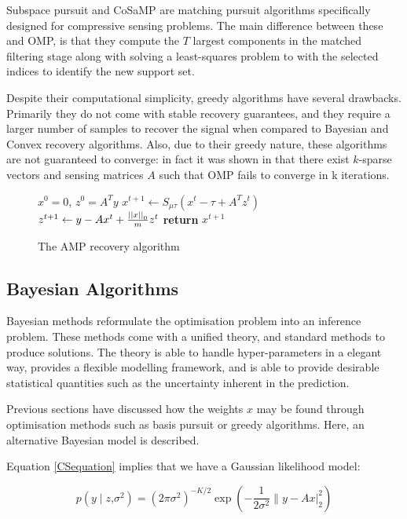 Subspace pursuit and CoSaMP are matching pursuit algorithms specifically designed for compressive sensing problems. The main difference between these and OMP, is that they compute the \(T\) largest components in the matched filtering stage along with solving a least-squares problem to with the selected indices to identify the new support set.

Despite their computational simplicity, greedy algorithms have several drawbacks. Primarily they do not come with stable recovery guarantees, and they require a larger number of samples to recover the signal when compared to Bayesian and Convex recovery algorithms. Also, due to their greedy nature, these algorithms are not guaranteed to converge: in fact it was shown in \cite{wen2013improved} that there exist \(k\)-sparse vectors and sensing matrices \(A\) such that OMP fails to converge in k iterations.

\begin{figure}
\begin{algorithmic}[1]
\State $x^0 = 0$, $z^0=A^Ty$
\State $x^{t+1} \gets S_{\mu\tau}\left(x^t - \tau+ A^Tz^t\right) $
\State $z^{t+1} \gets y - Ax^t + \frac{\left|\left|x\right|\right|_0}{m}z^t$
\EndWhile
\State \textbf{return} $x^{t+1}$
\EndProcedure
\end{algorithmic}
\caption{The AMP recovery algorithm}\label{alg:amp}
\end{figure}

\subsection{Bayesian Algorithms}
Bayesian methods reformulate the optimisation problem into an inference problem. These methods come with a unified theory, and standard methods to produce solutions. The theory is able to handle hyper-parameters in a elegant way, provides a flexible modelling framework, and is able to provide desirable statistical quantities such as the uncertainty inherent in the prediction.

Previous sections have discussed how the weights \(x\) may be found through optimisation methods such as basis pursuit or greedy algorithms. Here, an alternative Bayesian model is described.

Equation \eqref{CSequation} implies that we have a Gaussian likelihood model: 

\begin{equation}
p \left(y \mid z\text{,} \sigma^2 \right) = (2 \pi \sigma^2)^{-K/2} \exp{\left(- \frac{1}{2 \sigma^2} \|y - Ax|_{2}^{2} \right)} 
\end{equation}

